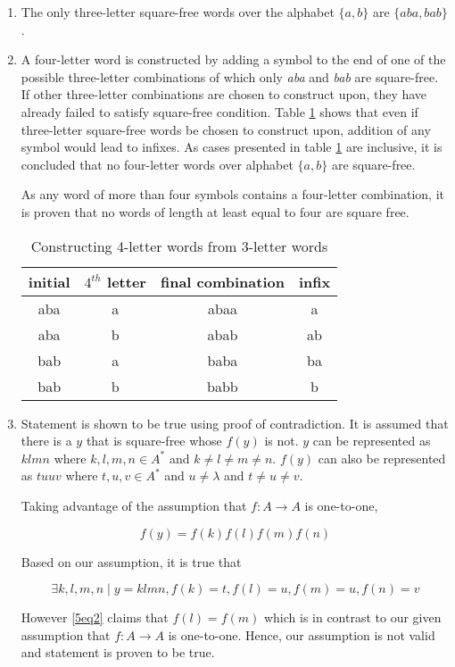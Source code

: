 \begin{enumerate}[label=(\alph*)]

	\item
	The only three-letter square-free words over the alphabet $\{a,b\}$ are $\{aba,bab\}$.

	\item
	A four-letter word is constructed by adding a symbol to the end of one of the possible three-letter combinations of which only \textit{aba} and \textit{bab} are square-free. If other three-letter combinations are chosen to construct upon, they have already failed to satisfy square-free condition. Table \ref{5tab1} shows that even if three-letter square-free words be chosen to construct upon, addition of any symbol would lead to infixes. As cases presented in table \ref{5tab1} are inclusive, it is concluded that no four-letter words over alphabet $\{a,b\}$ are square-free.

	As any word of more than four symbols contains a four-letter combination, it is proven that no words of length at least equal to four are square free.

	\begin{table}
		\centering
		\begin{tabular}{c|c|c|c}
			\textbf{initial} & \textbf{$4^{th}$ letter} & \textbf{final combination} & \textbf{infix}\\
			\hline
			aba & a & abaa & a\\
			aba & b & abab & ab\\
			bab & a & baba & ba\\
			bab & b & babb & b
		\end{tabular}
		\caption{Constructing 4-letter words from 3-letter words}\label{5tab1}
	\end{table}

	\item
	Statement is shown to be true using proof of contradiction. It is assumed that there is a $y$ that is square-free whose $f(y)$ is not. $y$ can be represented as $klmn$ where $k, l, m, n \in A^*$ and $k \neq l \neq m \neq n$. $f(y)$ can also be represented as $tuuv$ where $t, u, v \in A^*$ and $u \neq \lambda$ and $t \neq u \neq v$.

	Taking advantage of the assumption that $f:A\rightarrow A$ is one-to-one,

	\begin{equation}\label{5eq1}
	f(y) = f(k)f(l)f(m)f(n)
	\end{equation}

	Based on our assumption, it is true that

	\begin{equation}\label{5eq2}
	\exists k, l, m, n \mid y = klmn, f(k)=t, f(l)=u, f(m)=u, f(n)=v
	\end{equation}

	However \eqref{5eq2} claims that $f(l) = f(m)$ which is in contrast to our given assumption that $f:A\rightarrow A$ is one-to-one. Hence, our assumption is not valid and statement is proven to be true.

\end{enumerate}
